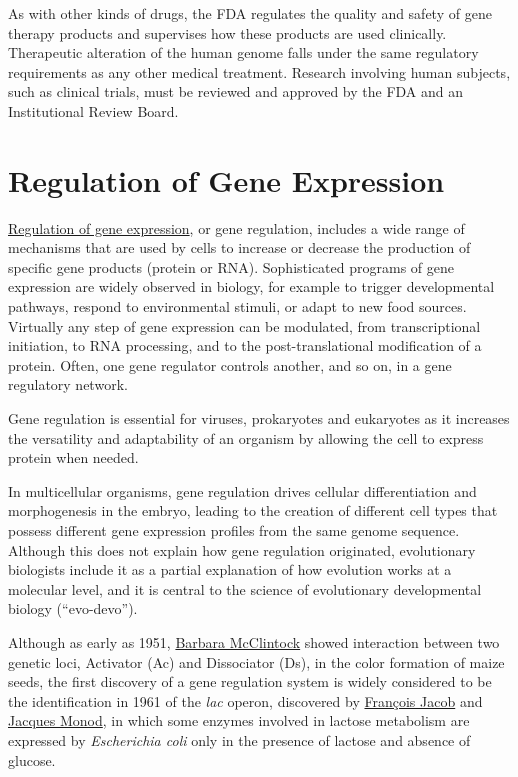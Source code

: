 As with other kinds of drugs, the FDA regulates the quality and safety of gene therapy products and supervises how these products are used clinically. Therapeutic alteration of the human genome falls under the same regulatory requirements as any other medical treatment. Research involving human subjects, such as clinical trials, must be reviewed and approved by the FDA and an Institutional Review Board.

\hypertarget{regulation-of-gene-expression}{%
\chapter{Regulation of Gene Expression}\label{regulation-of-gene-expression}}

\href{https://en.wikipedia.org/wiki/Regulation_of_gene_expression}{Regulation of gene expression}, or gene regulation, includes a wide range of mechanisms that are used by cells to increase or decrease the production of specific gene products (protein or RNA). Sophisticated programs of gene expression are widely observed in biology, for example to trigger developmental pathways, respond to environmental stimuli, or adapt to new food sources. Virtually any step of gene expression can be modulated, from transcriptional initiation, to RNA processing, and to the post-translational modification of a protein. Often, one gene regulator controls another, and so on, in a gene regulatory network.

Gene regulation is essential for viruses, prokaryotes and eukaryotes as it increases the versatility and adaptability of an organism by allowing the cell to express protein when needed.

In multicellular organisms, gene regulation drives cellular differentiation and morphogenesis in the embryo, leading to the creation of different cell types that possess different gene expression profiles from the same genome sequence. Although this does not explain how gene regulation originated, evolutionary biologists include it as a partial explanation of how evolution works at a molecular level, and it is central to the science of evolutionary developmental biology (``evo-devo'').

Although as early as 1951, \href{https://en.wikipedia.org/wiki/Barbara_McClintock}{Barbara McClintock} showed interaction between two genetic loci, Activator (Ac) and Dissociator (Ds), in the color formation of maize seeds, the first discovery of a gene regulation system is widely considered to be the identification in 1961 of the \emph{lac} operon, discovered by \href{https://en.wikipedia.org/wiki/Fran\%C3\%A7ois_Jacob}{François Jacob} and \href{https://en.wikipedia.org/wiki/Jacques_Monod}{Jacques Monod}, in which some enzymes involved in lactose metabolism are expressed by \emph{Escherichia coli} only in the presence of lactose and absence of glucose.

